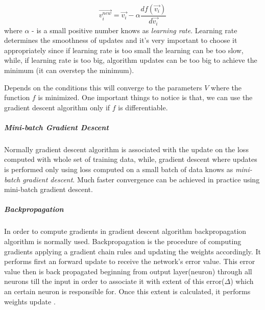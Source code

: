 \begin{equation} \label{eq:gd_update}
	\vec{v_i^{new}} = \vec{v_i} - \alpha \frac{df(\vec{v_i})}{d\vec{v_i}}
\end{equation}
where $\alpha$ - is a small positive number knows as \emph{learning rate}.
Learning rate determines the smoothness of updates and it's very important to choose
it appropriately since if learning rate is too small the learning can be too slow, while, if
learning rate is too big, algorithm updates can be too big to achieve the minimum
(it can overstep the minimum).

Depends on the conditions this will converge to the parameters $V$ where the function
$f$ is minimized.
One important things to notice is that, we can use the gradient descent algorithm only
if $f$ is differentiable. \cite{Bishop1995}

\subparagraph{Mini-batch Gradient Descent} Normally gradient descent algorithm
is associated with the update on the loss computed with whole set of training data,
while, gradient descent where updates is performed only using loss computed
on a small batch of data knows as \emph{mini-batch gradient descent}.
Much faster convergence can be achieved in practice using mini-batch gradient descent.
\cite{KarpathyAndrej2016}













\subparagraph{Backpropagation} In order to compute gradients in gradient descent algorithm
backpropagation algorithm is normally used. Backpropagation is the procedure of computing
gradients applying a gradient chain rules and updating the weights accordingly.
It performs first an forward update to receive the network's error value. This error
value then is back propagated beginning from output layer(neuron) through all neurons
till the input in order to associate it with extent of this error($\Delta$)
which an certain neuron is responsible
for. Once this extent is calculated, it performs weights update \cite{Rumelhart1986}.


